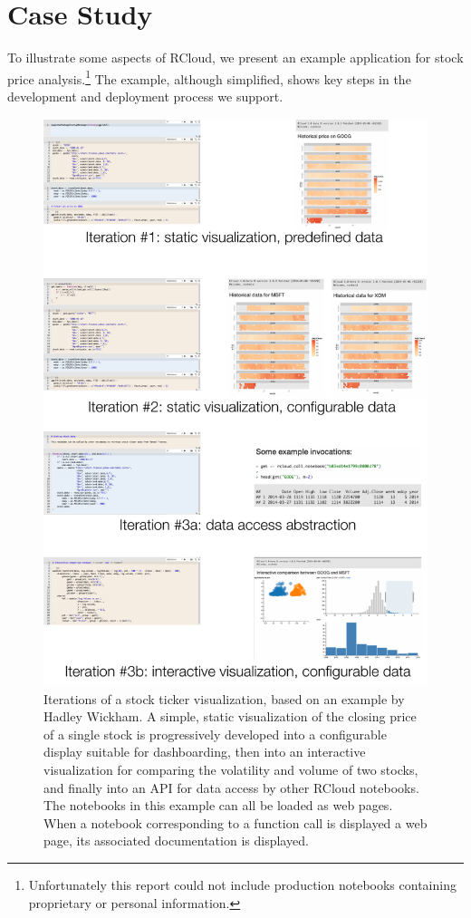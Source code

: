 \section{Case Study\label{sec:casestudy}}

To illustrate some aspects of RCloud, we present an example application
for stock price analysis.\footnote{Unfortunately this report could not
include production notebooks containing proprietary or personal information.}
The example, although simplified, shows key steps in the development
and deployment process we support.

\begin{figure}
\includegraphics[width=\linewidth]{fig/casestudy1/casestudy1.pdf}
\caption{\label{fig:stockvis}Iterations of a stock ticker
  visualization, based on an example by Hadley Wickham. A
  simple, static visualization of the closing price of a single stock
  is progressively developed into a configurable display suitable
  for dashboarding, then into an interactive visualization for 
  comparing the volatility and volume of two stocks, and finally
  into an API for data access by other RCloud notebooks. The notebooks
  in this example can all be loaded as web pages. When a notebook
  corresponding to a function call is displayed a web page,
  its associated documentation is displayed.}
\end{figure}

